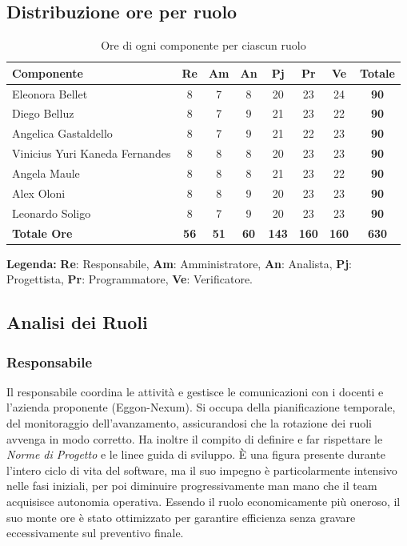 \documentclass[a4paper,12pt]{article}
\begin{document}
\subsection{Distribuzione ore per ruolo}
\begin{table}[h!]
\centering
\renewcommand{\arraystretch}{1.5}
\begin{tabular}{|l|c|c|c|c|c|c|c|}
\hline
\textbf{Componente} & \textbf{Re} & \textbf{Am} & \textbf{An} & \textbf{Pj} & \textbf{Pr} & \textbf{Ve} & \textbf{Totale} \\
\hline
Eleonora Bellet &8  &7  &8  &20  &23  &24  & \textbf{90} \\
\hline
Diego Belluz &8  &7  &9  &21  &23  &22  & \textbf{90} \\
\hline
Angelica Gastaldello &8  &7  &9  &21  &22  &23  & \textbf{90} \\
\hline
Vinicius Yuri Kaneda Fernandes &8  &8  &8  &20  &23  &23  & \textbf{90} \\
\hline
Angela Maule &8  &8  &8  &21  &23  &22 & \textbf{90} \\
\hline
Alex Oloni &8  &8  &9  &20  &23  &23  & \textbf{90} \\
\hline
Leonardo Soligo &8  &7  &9  &20  &23  &23  & \textbf{90} \\
\hline
\textbf{Totale Ore} & \textbf{56} & \textbf{51} & \textbf{60} & \textbf{143} & \textbf{160} & \textbf{160} & \textbf{630} \\
\hline
\end{tabular}
\caption{Ore di ogni componente per ciascun ruolo}
\label{tab:ore_componenti}
\vspace{0.2cm}
\footnotesize{\textbf{Legenda:} \textbf{Re}: Responsabile, \textbf{Am}: Amministratore, \textbf{An}: Analista, \textbf{Pj}: Progettista, \textbf{Pr}: Programmatore, \textbf{Ve}: Verificatore.}
\end{table}
\subsection{Analisi dei Ruoli}
\subsubsection{Responsabile}
Il responsabile coordina le attività e gestisce le comunicazioni con i docenti e l'azienda proponente (Eggon-Nexum). Si occupa della pianificazione temporale, del monitoraggio dell'avanzamento, assicurandosi che la rotazione dei ruoli avvenga in modo corretto. Ha inoltre il compito di definire e far rispettare le \textit{Norme di Progetto} e le linee guida di sviluppo. È una figura presente durante l'intero ciclo di vita del software, ma il suo impegno è particolarmente intensivo nelle fasi iniziali, per poi diminuire progressivamente man mano che il team acquisisce autonomia operativa. Essendo il ruolo economicamente più oneroso, il suo monte ore è stato ottimizzato per garantire efficienza senza gravare eccessivamente sul preventivo finale.
\end{document}
